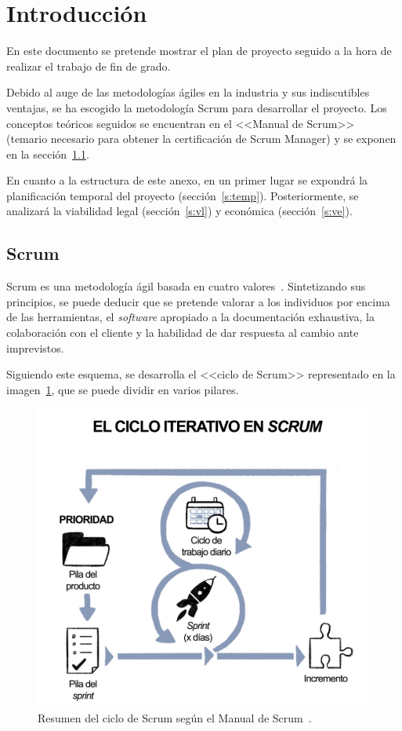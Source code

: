 
\section{Introducción}

En este documento se pretende mostrar el plan de proyecto seguido a la hora de realizar el trabajo de fin de grado.

Debido al auge de las metodologías ágiles en la industria y sus indiscutibles ventajas, se ha escogido la metodología Scrum para desarrollar el proyecto. Los conceptos teóricos seguidos se encuentran en el <<Manual de Scrum>>~\cite{scrumMaster2022} (temario necesario para obtener la certificación de Scrum Manager) y se exponen en la sección~\ref{s:scrum}.

En cuanto a la estructura de este anexo, en un primer lugar se expondrá la planificación temporal del proyecto (sección~\ref{s:temp}). Posteriormente, se analizará la viabilidad legal (sección~\ref{s:vl}) y económica (sección~\ref{s:ve}).

\subsection{Scrum}
\label{s:scrum}
Scrum es una metodología ágil basada en cuatro valores~\cite{scrumMaster2022}. Sintetizando sus principios, se puede deducir que se pretende valorar a los individuos por encima de las herramientas, el \textit{software} apropiado a la documentación exhaustiva, la colaboración con el cliente y la habilidad de dar respuesta al cambio ante imprevistos.

Siguiendo este esquema, se desarrolla el <<ciclo de Scrum>> representado en la imagen~\ref{img:ciclo_scrum}, que se puede dividir en varios pilares.

\begin{figure}[h]
	\caption[Resumen del ciclo de Scrum]{Resumen del ciclo de Scrum según el Manual de Scrum~\cite{scrumMaster2022}.}
	\label{img:ciclo_scrum}
	\centering
	\includegraphics[scale=0.45]{../img/anexos/scrum/ciclo}
\end{figure}

